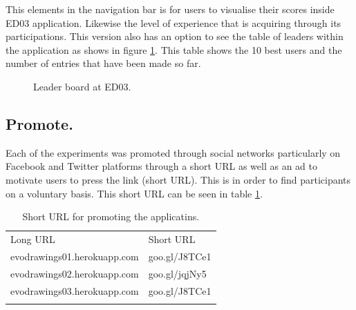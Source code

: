 This elements in the navigation bar is for users to visualise their scores
inside ED03 application. Likewise the level of experience that is acquiring
through its participations. This version also has an option to see the table of
leaders within the application as shows in figure \ref{fig:leaderBoard}. This table shows the
10 best users and the number of entries that have been made so far.


\begin{figure}
\captionsetup{justification=centering,margin=2cm}
\centering
\setlength\fboxsep{0pt}
\setlength\fboxrule{0.7pt}
\caption{Leader board at ED03.}
\label{fig:leaderBoard}       
\end{figure}


\subsection{Promote.}

Each of the experiments was promoted through social networks particularly on
Facebook and Twitter platforms through a short URL as well as an ad to motivate
users to press the link (short URL). This is in order to find participants on a
voluntary basis. This short URL can be seen in table \ref{tab:PromoteUrl}.

\begin{table}
\small
\caption{Short URL for promoting the applicatins.}
\label{tab:PromoteUrl} 
\centering
\small
\begin{tabular}{p{5cm} p{4cm}  }
\hline\noalign{\smallskip}
 Long URL & Short URL \\
\noalign{\smallskip}\hline\noalign{\smallskip}
\small{evodrawings01.herokuapp.com } & \small{goo.gl/J8TCe1}  \\ \hline 
\small{evodrawings02.herokuapp.com } & \small{goo.gl/jqjNy5}  \\ \hline
\small{evodrawings03.herokuapp.com} & \small{goo.gl/J8TCe1}  \\ \hline
\noalign{\smallskip}\hline
\end{tabular}
\end{table}


